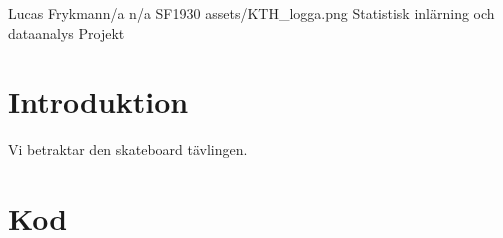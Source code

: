 \documentclass{assignment}
\begin{document}
\assignmentTitle
{Lucas Frykman}{n/a}
{n/a}
{SF1930}
{assets/KTH_logga.png}
{Statistisk inlärning och dataanalys}
{Projekt}

\section{Introduktion}

Vi betraktar den skateboard tävlingen.


\section{Kod}
 
\end{document}
